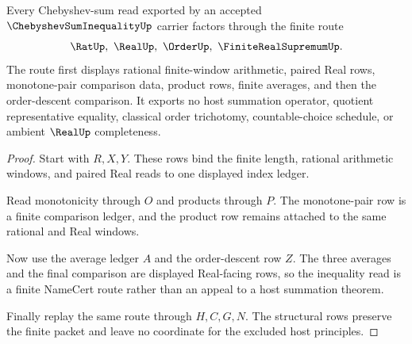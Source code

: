 \begin{theorem}
\label{thm:chebyshev-sum-inequality-finite-average-route}
Every Chebyshev-sum read exported by an accepted $\ChebyshevSumInequalityUp$ carrier factors through the finite route
$$
\RatUp,\ \RealUp,\ \OrderUp,\ \FiniteRealSupremumUp .
$$
The route first displays rational finite-window arithmetic, paired Real rows, monotone-pair comparison data, product rows, finite averages, and then the order-descent comparison. It exports no host summation operator, quotient representative equality, classical order trichotomy, countable-choice schedule, or ambient $\RealUp$ completeness.
\end{theorem}
\begin{proof}
Start with $R,X,Y$. These rows bind the finite length, rational arithmetic windows, and paired Real reads to one displayed index ledger.

Read monotonicity through $O$ and products through $P$. The monotone-pair row is a finite comparison ledger, and the product row remains attached to the same rational and Real windows.

Now use the average ledger $A$ and the order-descent row $Z$. The three averages and the final comparison are displayed Real-facing rows, so the inequality read is a finite NameCert route rather than an appeal to a host summation theorem.

Finally replay the same route through $H,C,G,N$. The structural rows preserve the finite packet and leave no coordinate for the excluded host principles.
\end{proof}




